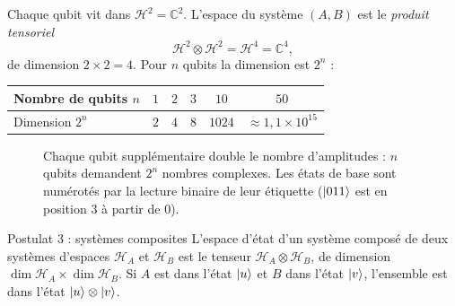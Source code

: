 Chaque qubit vit dans $\mathcal{H}^2=\mathbb{C}^2$. L'espace du système $(A,B)$ est le
\emph{produit tensoriel}
\[
  \mathcal{H}^2\otimes\mathcal{H}^2=\mathcal{H}^4=\mathbb{C}^4 ,
\]
de dimension $2\times2=4$. Pour $n$ qubits la dimension est $2^n$ :

\begin{center}
\renewcommand{\arraystretch}{1.3}
\begin{tabular}{@{}lccccc@{}}
\toprule
Nombre de qubits $n$ & $1$ & $2$ & $3$ & $10$ & $50$ \\
\midrule
Dimension $2^n$ & $2$ & $4$ & $8$ & $1024$ & $\approx1{,}1\times10^{15}$ \\
\bottomrule
\end{tabular}
\end{center}

\begin{figure}[!ht]
\centering
{}
\caption{Chaque qubit supplémentaire double le nombre d'amplitudes : $n$ qubits demandent $2^n$
nombres complexes. Les états de base sont numérotés par la lecture binaire de leur étiquette
($|011\rangle$ est en position $3$ à partir de $0$).}
\label{fig:croissance}
\end{figure}

\begin{resultat}{Postulat 3 : systèmes composites}
L'espace d'état d'un système composé de deux systèmes d'espaces $\mathcal{H}_A$ et
$\mathcal{H}_B$ est le \gls{tenseur} $\mathcal{H}_A\otimes\mathcal{H}_B$, de dimension
$\dim\mathcal{H}_A\times\dim\mathcal{H}_B$. Si $A$ est dans l'état $|u\rangle$ et $B$ dans l'état
$|v\rangle$, l'ensemble est dans l'état $|u\rangle\otimes|v\rangle$.
\end{resultat}

